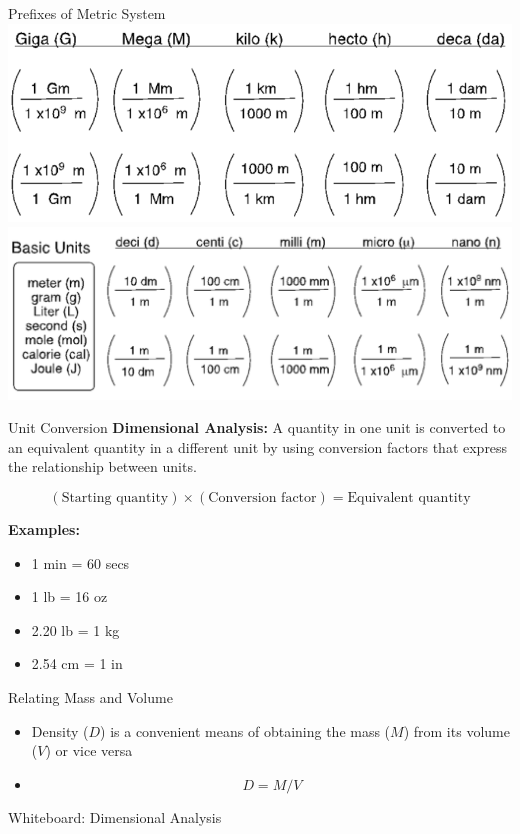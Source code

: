 \documentclass[11pt]{beamer}
\begin{document}
\begin{frame}{Prefixes of Metric System}
  \centering
  \includegraphics[scale=0.3]{metric_1}
  \includegraphics[scale=0.3]{metric_2}
\end{frame}

\begin{frame}{Unit Conversion}
  \textbf{Dimensional Analysis:} A quantity in one unit is converted
  to an equivalent quantity in a different unit by using conversion
  factors that express the relationship between units.

  \begin{equation}
    (\text{Starting quantity})\times (\text{Conversion factor})
    = \text{Equivalent quantity}
  \end{equation}

  \textbf{Examples:}
  \begin{itemize}
  \item 1 min = 60 secs
  \item 1 lb = 16 oz
  \item 2.20 lb = 1 kg
  \item 2.54 cm = 1 in
  \end{itemize}
\end{frame}

\begin{frame}{Relating Mass and Volume}
  \begin{itemize}
  \item Density ($D$) is a convenient means of obtaining the
    mass ($M$) from its volume ($V$) or vice versa
  \item[] \begin{equation}
    D = M/V
  \end{equation}
  \end{itemize}
\end{frame}

\begin{frame}{Whiteboard: Dimensional Analysis}
\end{frame}
\end{document}
